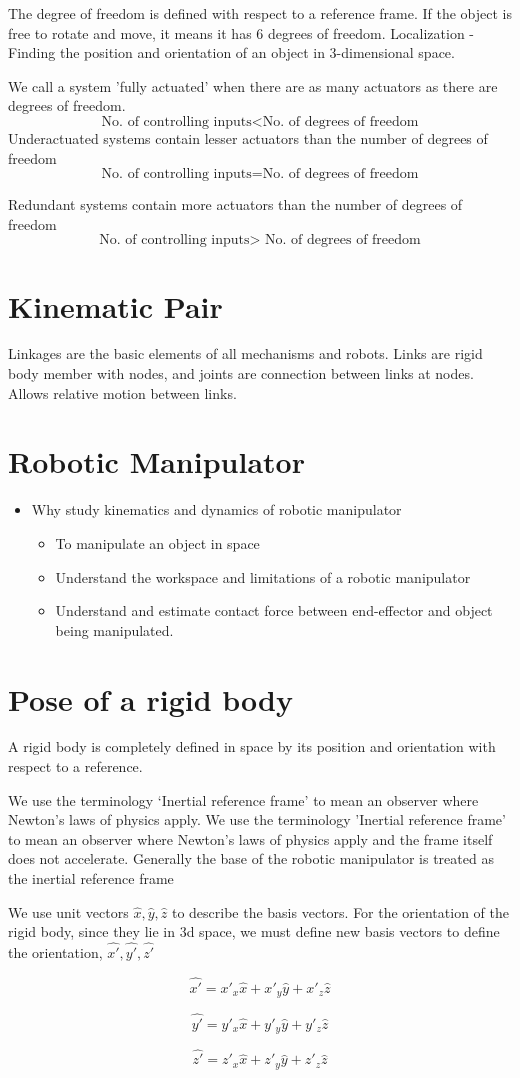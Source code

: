 \documentclass[11pt]{report}
\begin{document}
The degree of freedom is defined with respect to a reference frame. If the object is free to rotate and move, it means it has 6 degrees of freedom.
Localization - Finding the position and orientation of an object in 3-dimensional space.

We call a system 'fully actuated' when there are as many actuators as there are degrees of freedom.
$$\text{No. of controlling inputs} < \text{No. of degrees of freedom}$$
Underactuated systems contain lesser actuators than the number of degrees of freedom
$$\text{No. of controlling inputs} = \text{No. of degrees of freedom}$$

Redundant systems contain more actuators than the number of degrees of freedom
$$\text{No. of controlling inputs} >\text{ No. of degrees of freedom}$$
\section{Kinematic Pair}
\label{sec:org72915d7}
Linkages are the basic elements of all mechanisms and robots. Links are rigid body member with nodes, and joints are connection between links at nodes. Allows relative motion between links.
\section{Robotic Manipulator}
\label{sec:org0c80cb8}
\begin{itemize}
\item Why study kinematics and dynamics of robotic manipulator
\begin{itemize}
\item To manipulate an object in space
\item Understand the workspace and limitations of a robotic manipulator
\item Understand and estimate contact force between end-effector and object being manipulated.
\end{itemize}
\end{itemize}
\section{Pose of a rigid body}
\label{sec:org240df11}
A rigid body is completely defined in space by its position and orientation with respect to a reference.

We use the terminology `Inertial reference frame' to mean an observer where Newton's laws of physics apply. We use the terminology 'Inertial reference frame' to mean an observer where Newton's laws of physics apply and the frame itself does not accelerate. Generally the base of the robotic manipulator is treated as the inertial reference frame

We use unit vectors \(\hat{x},\hat{y},\hat{z}\) to describe the basis vectors. For the orientation of the rigid body, since they lie in 3d space, we must define new basis vectors to define the orientation, \(\hat{x'}, \hat{y'}, \hat{z'}\)

$$
\hat{x'} = x'_x \hat{x} + x'_y\hat{y} + x'_z\hat{z}
$$

$$
\hat{y'} = y'_x \hat{x} + y'_y\hat{y} + y'_z\hat{z}
$$

$$
\hat{z'} = z'_x \hat{x} + z'_y\hat{y} + z'_z\hat{z}
$$
\end{document}
